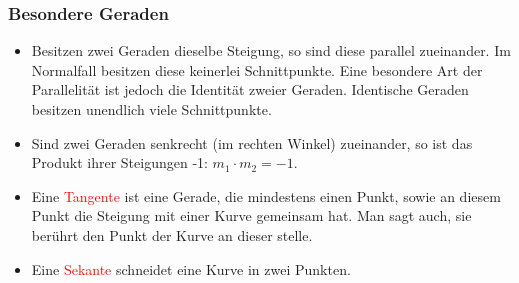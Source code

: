 \subsubsection{Besondere Geraden}
\begin{itemize}
\item Besitzen zwei Geraden dieselbe Steigung, so sind diese parallel zueinander. Im Normalfall besitzen diese keinerlei Schnittpunkte. Eine besondere Art der Parallelität ist jedoch die Identität zweier Geraden. Identische Geraden besitzen unendlich viele Schnittpunkte.
\item Sind zwei Geraden senkrecht (im rechten Winkel) zueinander, so ist das Produkt ihrer Steigungen -1: $m_1 \cdot m_2 = -1$.
\item Eine  \textcolor{red}{Tangente} ist eine Gerade, die mindestens einen Punkt, sowie an diesem Punkt die Steigung mit einer Kurve gemeinsam hat. Man sagt auch, sie berührt den Punkt der Kurve an dieser stelle.
\item Eine  \textcolor{red}{Sekante} schneidet eine Kurve in zwei Punkten.
\end{itemize}